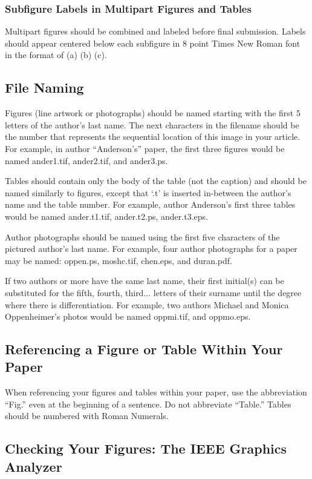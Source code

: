 \documentclass[journal]{IEEEtai}
\begin{document}
\subsubsection{Subfigure Labels in Multipart Figures and Tables}

Multipart figures should be combined and labeled before final submission. Labels should appear centered below each subfigure in 8 point Times New Roman font in the format of (a) (b) (c). 

\subsection{File Naming}

Figures (line artwork or photographs) should be named starting with the first 5 letters of the author’s last name. The next characters in the filename should be the number that represents the sequential location of this image in your article. For example, in author ``Anderson's'' paper, the first three figures would be named ander1.tif, ander2.tif, and ander3.ps.

Tables should contain only the body of the table (not the caption) and should be named similarly to figures, except that `.t' is inserted in-between the author's name and the table number. For example, author Anderson's first three tables would be named ander.t1.tif, ander.t2.ps, ander.t3.eps.

Author photographs should be named using the first five characters of the pictured author's last name. For example, four author photographs for a paper may be named: oppen.ps, moshc.tif, chen.eps, and duran.pdf.

If two authors or more have the same last name, their first initial(s) can be substituted for the fifth, fourth, third... letters of their surname until the degree where there is differentiation. For example, two authors Michael and Monica Oppenheimer's photos would be named oppmi.tif, and oppmo.eps.

\subsection{Referencing a Figure or Table Within Your Paper}
 
When referencing your figures and tables within your paper, use the abbreviation ``Fig.'' even at the beginning of a sentence. Do not abbreviate ``Table.'' Tables should be numbered with Roman Numerals.

\subsection{Checking Your Figures: The IEEE Graphics Analyzer}
\end{document}
